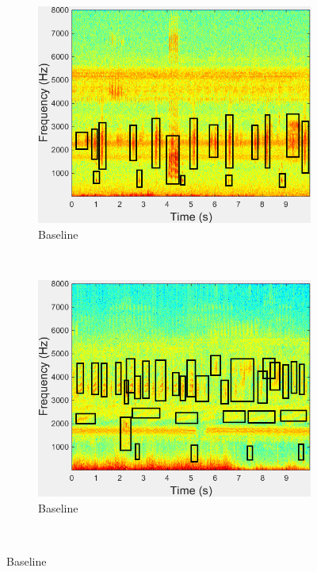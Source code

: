 \begin{figure}
        \centering       
        \begin{subfigure}[b]{0.35\textwidth}
                \includegraphics[width=\textwidth]{image/Ch7/spectrogram1-m.png}
                \caption{Baseline}
        \end{subfigure}%
 ~       
        \begin{subfigure}[b]{0.35\textwidth}
                \includegraphics[width=\textwidth]{image/Ch7/spectrogram2-m.png}
                \caption{Baseline}
        \end{subfigure}%
        \\          

\end{figure}
